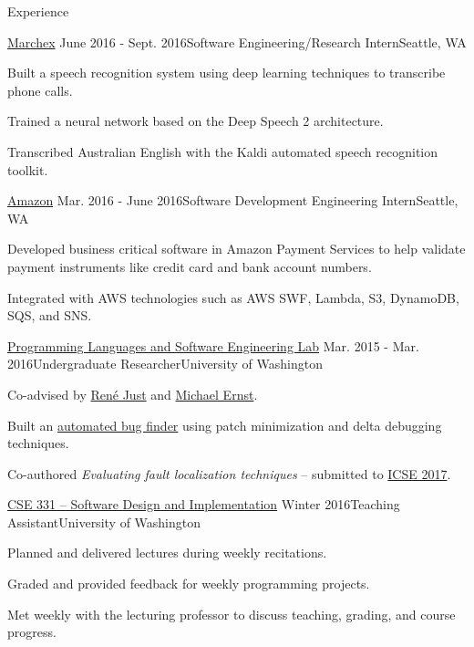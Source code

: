\documentclass{resume} %
\begin{document}

\begin{rSection}{Experience}

  \begin{rSubsection}{\href{http://www.marchex.com/}{Marchex}}
    {June 2016 - Sept. 2016}{Software Engineering/Research Intern}{Seattle, WA}
  \item Built a speech recognition system using deep learning techniques to transcribe phone calls.
  \item Trained a neural network based on the Deep Speech 2 architecture.
  \item Transcribed Australian English with the Kaldi automated speech recognition toolkit.
  \end{rSubsection}

  \begin{rSubsection}{\href{https://www.amazon.com/}{Amazon}}
    {Mar. 2016 - June 2016}{Software Development Engineering Intern}{Seattle, WA}
  \item Developed business critical software in Amazon Payment Services to help validate payment instruments like credit card and bank account numbers.
  \item Integrated with AWS technologies such as AWS SWF, Lambda, S3, DynamoDB, SQS, and SNS.
  \end{rSubsection}

  \begin{rSubsection}{\href{https://uwplse.org/}{Programming Languages and Software Engineering Lab}}
    {Mar. 2015 - Mar. 2016}{Undergraduate Researcher}{University of Washington}
  \item Co-advised by \href{https://people.cs.umass.edu/~rjust/}{Ren{\'e} Just} and \href{https://homes.cs.washington.edu/~mernst/}{Michael Ernst}.
  \item Built an \href{https://github.com/pderichai/patch-minimization}{automated bug finder} using patch minimization and delta debugging techniques.
  \item Co-authored \emph{Evaluating fault localization techniques} -- submitted to \href{http://icse2017.gatech.edu/}{ICSE 2017}.
  \end{rSubsection}
  
  \begin{rSubsection}{\href{https://courses.cs.washington.edu/courses/cse331/16wi/}{CSE 331 -- Software Design and Implementation}}
    {Winter 2016}{Teaching Assistant}{University of Washington}
  \item Planned and delivered lectures during weekly recitations.
  \item Graded and provided feedback for weekly programming projects.
  \item Met weekly with the lecturing professor to discuss teaching, grading, and course progress.
  \end{rSubsection}
  
\end{rSection}
\end{document}
